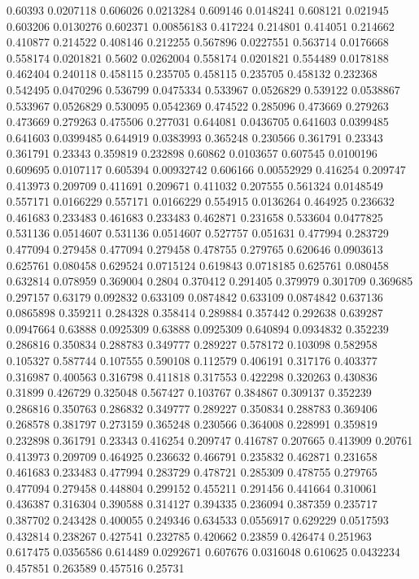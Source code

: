 0.60393 0.0207118
0.606026 0.0213284
0.609146 0.0148241
0.608121 0.021945
0.603206 0.0130276
0.602371 0.00856183
0.417224 0.214801
0.414051 0.214662
0.410877 0.214522
0.408146 0.212255
0.567896 0.0227551
0.563714 0.0176668
0.558174 0.0201821
0.5602 0.0262004
0.558174 0.0201821
0.554489 0.0178188
0.462404 0.240118
0.458115 0.235705
0.458115 0.235705
0.458132 0.232368
0.542495 0.0470296
0.536799 0.0475334
0.533967 0.0526829
0.539122 0.0538867
0.533967 0.0526829
0.530095 0.0542369
0.474522 0.285096
0.473669 0.279263
0.473669 0.279263
0.475506 0.277031
0.644081 0.0436705
0.641603 0.0399485
0.641603 0.0399485
0.644919 0.0383993
0.365248 0.230566
0.361791 0.23343
0.361791 0.23343
0.359819 0.232898
0.60862 0.0103657
0.607545 0.0100196
0.609695 0.0107117
0.605394 0.00932742
0.606166 0.00552929
0.416254 0.209747
0.413973 0.209709
0.411691 0.209671
0.411032 0.207555
0.561324 0.0148549
0.557171 0.0166229
0.557171 0.0166229
0.554915 0.0136264
0.464925 0.236632
0.461683 0.233483
0.461683 0.233483
0.462871 0.231658
0.533604 0.0477825
0.531136 0.0514607
0.531136 0.0514607
0.527757 0.051631
0.477994 0.283729
0.477094 0.279458
0.477094 0.279458
0.478755 0.279765
0.620646 0.0903613
0.625761 0.080458
0.629524 0.0715124
0.619843 0.0718185
0.625761 0.080458
0.632814 0.078959
0.369004 0.2804
0.370412 0.291405
0.379979 0.301709
0.369685 0.297157
0.63179 0.092832
0.633109 0.0874842
0.633109 0.0874842
0.637136 0.0865898
0.359211 0.284328
0.358414 0.289884
0.357442 0.292638
0.639287 0.0947664
0.63888 0.0925309
0.63888 0.0925309
0.640894 0.0934832
0.352239 0.286816
0.350834 0.288783
0.349777 0.289227
0.578172 0.103098
0.582958 0.105327
0.587744 0.107555
0.590108 0.112579
0.406191 0.317176
0.403377 0.316987
0.400563 0.316798
0.411818 0.317553
0.422298 0.320263
0.430836 0.31899
0.426729 0.325048
0.567427 0.103767
0.384867 0.309137
0.352239 0.286816
0.350763 0.286832
0.349777 0.289227
0.350834 0.288783
0.369406 0.268578
0.381797 0.273159
0.365248 0.230566
0.364008 0.228991
0.359819 0.232898
0.361791 0.23343
0.416254 0.209747
0.416787 0.207665
0.413909 0.20761
0.413973 0.209709
0.464925 0.236632
0.466791 0.235832
0.462871 0.231658
0.461683 0.233483
0.477994 0.283729
0.478721 0.285309
0.478755 0.279765
0.477094 0.279458
0.448804 0.299152
0.455211 0.291456
0.441664 0.310061
0.436387 0.316304
0.390588 0.314127
0.394335 0.236094
0.387359 0.235717
0.387702 0.243428
0.400055 0.249346
0.634533 0.0556917
0.629229 0.0517593
0.432814 0.238267
0.427541 0.232785
0.420662 0.23859
0.426474 0.251963
0.617475 0.0356586
0.614489 0.0292671
0.607676 0.0316048
0.610625 0.0432234
0.457851 0.263589
0.457516 0.25731
